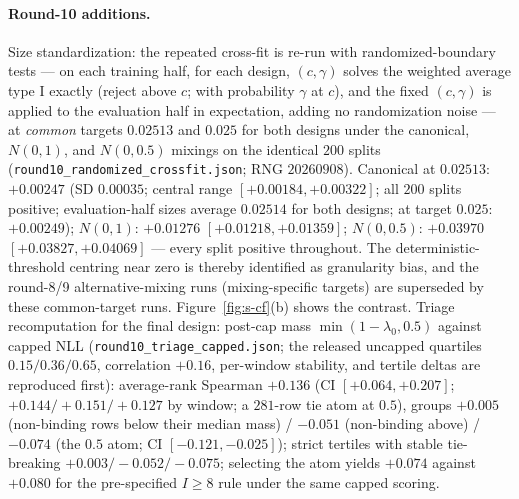 \documentclass[11pt]{article}
\begin{document}
\paragraph{Round-10 additions.} Size standardization: the repeated
cross-fit is re-run with randomized-boundary
tests --- on each training half, for each design, $(c, \gamma)$ solves
the weighted average type I exactly (reject above $c$; with probability
$\gamma$ at $c$), and the fixed $(c, \gamma)$ is applied to the
evaluation half in expectation, adding no randomization noise --- at
\emph{common} targets $0.02513$ and $0.025$ for both designs under the
canonical, $N(0,1)$, and $N(0,0.5)$ mixings on the identical $200$
splits (\texttt{round10\_\allowbreak randomized\_crossfit.json}; RNG
$20260908$). Canonical at $0.02513$: $+0.00247$ (SD $0.00035$; central
range $[+0.00184,+0.00322]$; all $200$ splits positive;
evaluation-half sizes average $0.02514$ for both designs; at target
$0.025$: $+0.00249$); $N(0,1)$: $+0.01276$ $[+0.01218,+0.01359]$;
$N(0,0.5)$: $+0.03970$ $[+0.03827,+0.04069]$ --- every split positive
throughout. The deterministic-threshold centring near zero is thereby
identified as granularity bias, and the round-8/9 alternative-mixing
runs (mixing-specific targets) are superseded by these common-target
runs. Figure~\ref{fig:s-cf}(b) shows the contrast. Triage
recomputation for the final design: post-cap mass
$\min(1-\lambda_0, 0.5)$ against capped NLL
(\texttt{round10\_triage\_capped.json}; the released uncapped
quartiles $0.15/0.36/0.65$, correlation $+0.16$, per-window stability,
and tertile deltas are reproduced first): average-rank Spearman
$+0.136$ (CI $[+0.064,+0.207]$; $+0.144/+0.151/+0.127$ by window; a
$281$-row tie atom at $0.5$), groups $+0.005$ (non-binding rows below
their median mass) / $-0.051$ (non-binding above) / $-0.074$ (the
$0.5$ atom; CI $[-0.121,-0.025]$); strict tertiles with stable
tie-breaking $+0.003/-0.052/-0.075$; selecting the atom yields
$+0.074$ against $+0.080$ for the pre-specified $I \ge 8$ rule under
the same capped scoring.
\end{document}
